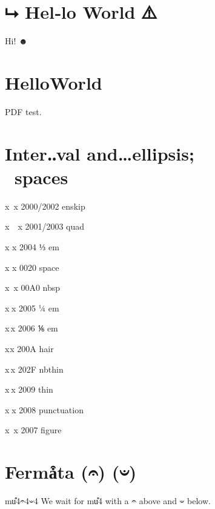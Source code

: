 \documentclass{article}%
\begin{document}
\section{⮡ Hel‑lo World ⚠}

Hi! ☻

\makeatletter%
\section{\unicodepointsUni@tarentPfeil{} Hel\unicodepoints@nbdash{}lo\underbar{}World \unicodepoints@warn{}}
\makeatother%

 PDF test.

\section{Inter‥val and…ellipsis;            spaces}

{\Huge x x} 2000/2002 enskip

{\Huge x x} 2001/2003 quad

{\Huge x x} 2004 ⅓ em

{\Huge x x} 0020 space

{\Huge x x} 00A0 nbsp

{\Huge x x} 2005 ¼ em

{\Huge x x} 2006 ⅙ em

{\Huge x x} 200A hair

{\Huge x x} 202F nbthin

{\Huge x x} 2009 thin

{\Huge x x} 2008 punctuation

{\Huge x x} 2007 figure

\section{Ferma͒ta (𝄐) (𝄑)}

{\Huge mu͒4𝄐4𝄑4} We wait for mu͒4 with a 𝄐 above and 𝄑 below.
\end{document}
